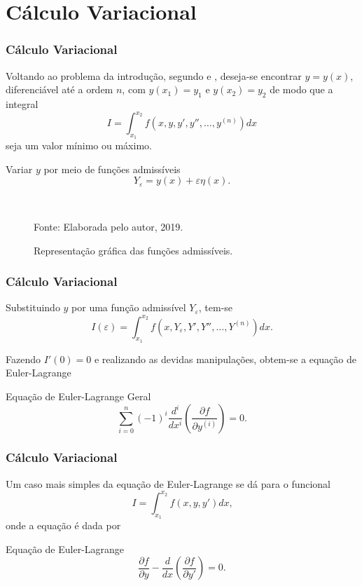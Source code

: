 \documentclass{beamer}
\newcommand{\fonte}[1]{
	\begin{center}
		\footnotesize Fonte: #1
	\end{center}
}
\newcommand{\fonteElaboradaPeloAutor}{
	\fonte{Elaborada pelo autor, 2019.}
}
\begin{document}
	\section{Cálculo Variacional}
	
	\begin{frame}
		\frametitle{Cálculo Variacional}
		\justify
		
		Voltando ao problema da introdução, segundo  e , deseja-se encontrar $y=y(x)$, diferenciável até a ordem $n$, com $y(x_1)=y_1$ e $y(x_2)=y_2$ de modo que a integral
		$$
			I = \int_{x_1}^{x_2} f(x, y, y', y'', \dots, y^{(n)})dx
		$$
		seja um valor mínimo ou máximo.
		\vspace{10pt}
		\pause
		
		Variar $y$ por meio de funções admissíveis
		$$
			Y_{\varepsilon}=y(x)+\varepsilon\eta(x)
			\text{.}
		$$
	\end{frame}
	
	\encapsulateBackgroundLessFrames
	{
		\begin{frame}
			\begin{figure}
				\caption{Representação gráfica das funções admissíveis.}
				\begin{center}
					\resizebox{0.5\textwidth}{!}{
						
					}\\
					\fonteElaboradaPeloAutor
				\end{center}
				\label{fig:func_approx}
			\end{figure}
		\end{frame}
	}

	\begin{frame}
		\frametitle{Cálculo Variacional}
		\justify
		
		Substituindo $y$ por uma função admissível $Y_{\varepsilon}$, tem-se
		$$
			I(\varepsilon) = \int_{x_1}^{x_2} f(x, Y_{\varepsilon}, Y', Y'', \dots, Y^{(n)})dx
			\text{.}
		$$
		\pause
		
		Fazendo $I'(0)=0$ e realizando as devidas manipulações, obtem-se a equação de Euler-Lagrange
		\begin{block}{Equação de Euler-Lagrange Geral}
			$$
				\sum_{i=0}^n (-1)^i\frac{d^i}{dx^i}\left (
					\frac{\partial f}{\partial y^{(i)}}
				\right )
				= 0
				\text{.}
			$$
		\end{block}
	\end{frame}
	
	\begin{frame}
		\frametitle{Cálculo Variacional}
		\justify

		Um caso mais simples da equação de Euler-Lagrange se dá para o funcional
		$$
			I=\int_{x_1}^{x_2} f(x, y, y')dx
			\text{,}
		$$
		onde a equação é dada por
		
		\begin{block}{Equação de Euler-Lagrange}
			$$
				\frac{\partial f}{\partial y} - \frac{d}{dx} \left ( \frac{\partial f}{\partial y'} \right )=0 \text{.}
			$$
		\end{block}
	\end{frame}
	
\end{document}
